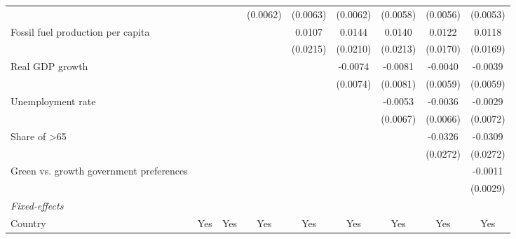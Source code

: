 \begin{table}[htbp]
\begin{tabular}{lcccccccc}
                                                &                &               & (0.0062)       & (0.0063)      & (0.0062)       & (0.0058)       & (0.0056)       & (0.0053)\\   
      Fossil fuel production per capita         &                &               &                & 0.0107        & 0.0144         & 0.0140         & 0.0122         & 0.0118\\   
                                                &                &               &                & (0.0215)      & (0.0210)       & (0.0213)       & (0.0170)       & (0.0169)\\   
      Real GDP growth                           &                &               &                &               & -0.0074        & -0.0081        & -0.0040        & -0.0039\\   
                                                &                &               &                &               & (0.0074)       & (0.0081)       & (0.0059)       & (0.0059)\\   
      Unemployment rate                         &                &               &                &               &                & -0.0053        & -0.0036        & -0.0029\\   
                                                &                &               &                &               &                & (0.0067)       & (0.0066)       & (0.0072)\\   
      Share of >65                              &                &               &                &               &                &                & -0.0326        & -0.0309\\   
                                                &                &               &                &               &                &                & (0.0272)       & (0.0272)\\   
      Green vs. growth government preferences   &                &               &                &               &                &                &                & -0.0011\\   
                                                &                &               &                &               &                &                &                & (0.0029)\\   
      \midrule
      \emph{Fixed-effects}\\
      Country                                   & Yes            & Yes           & Yes            & Yes           & Yes            & Yes            & Yes            & Yes\\  

\end{tabular}
\end{table}
